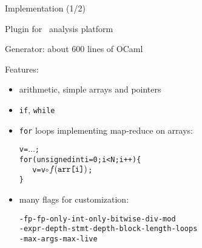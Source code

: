 \documentclass{beamer}
\begin{document}
\begin{frame}{Implementation (1/2)}

Plugin for~ analysis platform

Generator: about 600 lines of OCaml

Features:
\begin{itemize}
\item arithmetic, simple arrays and pointers
\item \texttt{if}, \texttt{while}
\item \texttt{for} loops implementing map-reduce on arrays:
\begin{alltt}
v = \(\dots\); \\
for (unsigned int i = 0; i < N; i++) \{ \\
\mbox{ \ \ } v = v \(\circ\) \(f(\mbox{\texttt{arr[i]}})\); \\
\}
\end{alltt}
\item many flags for customization:
\begin{alltt}
-fp -fp-only -int-only -bitwise -div-mod \\
-expr-depth -stmt-depth -block-length -loops \\
-max-args -max-live
\end{alltt}
\end{itemize}

\end{frame}


\end{document}
